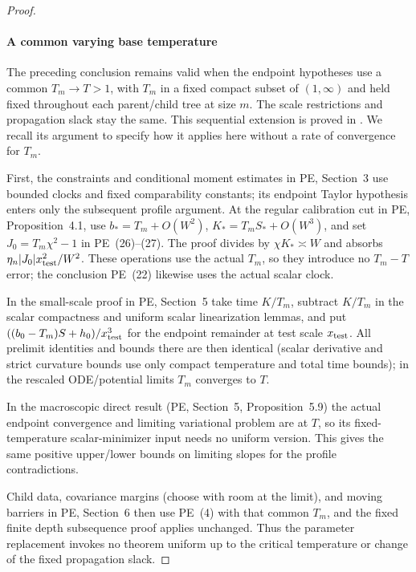 \begin{proof}
\paragraph{A common varying base temperature}
The preceding conclusion remains valid when the endpoint hypotheses
use a common \(T_m\to T>1\), with \(T_m\) in a fixed compact subset
of \((1,\infty)\) and held fixed throughout each parent/child tree
at size \(m\). The scale restrictions and propagation slack stay
the same. This sequential extension is proved in
\cite[Appendix: Companion interfaces, paragraph
``A common prelimit temperature'']{PE}.
We recall its argument to specify how it applies here without a rate
of convergence for \(T_m\).

First, the constraints and conditional moment estimates in PE,
Section~3 use bounded clocks and fixed comparability constants;
its endpoint Taylor hypothesis enters only the subsequent profile
argument. At the regular calibration cut in PE, Proposition~4.1,
use \(b_*=T_m+O(W^2)\), \(K_*=T_mS_*+O(W^3)\), and set
\(J_0=T_m\chi^2-1\) in PE~(26)--(27). The proof divides by
\(\chi K_*\asymp W\) and absorbs
\(\eta_n|J_0|x_{\rm test}^2/W^2\). These operations use the actual
\(T_m\), so they introduce no \(T_m-T\) error; the conclusion
PE~(22) likewise uses the actual scalar clock.

In the small-scale proof in PE, Section~5 take time \(K/T_m\), subtract \(K/T_m\) in the scalar compactness and uniform scalar linearization lemmas, and put \(((b_0-T_m)S+h_0)/x_{\rm test}^3\) for the endpoint remainder at test scale \(x_{\rm test}\). All prelimit identities and bounds there are then identical (scalar derivative and strict curvature bounds use only compact temperature and total time bounds); in the rescaled ODE/potential limits \(T_m\) converges to \(T\).

In the macroscopic direct result (PE, Section~5, Proposition~5.9) the actual endpoint convergence and limiting variational problem are at \(T\), so its fixed-temperature scalar-minimizer input needs no uniform version. This gives the same positive upper/lower bounds on limiting slopes for the profile contradictions.

Child data, covariance margins (choose with room at the limit), and moving barriers in PE, Section~6 then use PE~(4) with that common \(T_m\), and the fixed finite depth subsequence proof applies unchanged. Thus the parameter replacement invokes no theorem uniform up to the critical temperature or change of the fixed propagation slack.


\end{proof}

